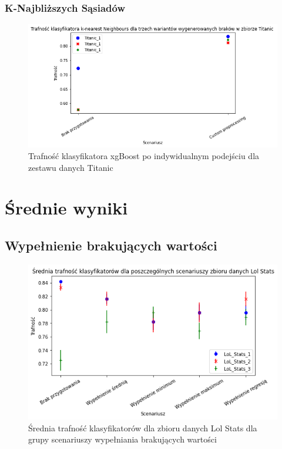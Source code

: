 \documentclass{book}
\begin{document}
\subsubsection{K-Najbliższych Sąsiadów}
\begin{figure}[H]
    \centerline{\includegraphics[scale=0.5]{Titanic_knn_Custom}}
    \centering
    \caption{Trafność klasyfikatora xgBoost po indywidualnym podejściu dla zestawu danych Titanic}
    \end{figure}


\section{Średnie wyniki}

\subsection{Wypełnienie brakujących wartości}

\begin{figure}[H]
    \centerline{\includegraphics[scale=0.5]{Lol_Stats_Avg_Wypełnienie_brakujących}}
    \centering
    \caption{Średnia trafność klasyfikatorów dla zbioru danych Lol Stats 
    dla grupy scenariuszy wypełniania brakujących wartości}
    \end{figure}
\end{document}
